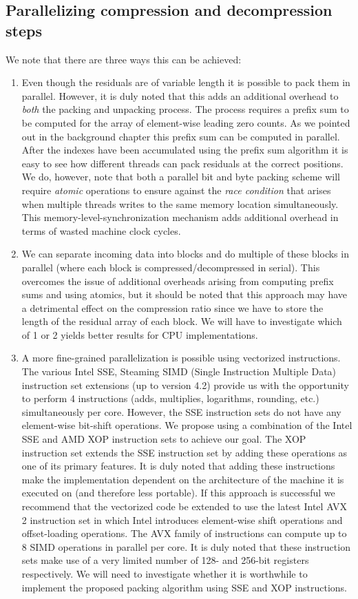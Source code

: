 \documentclass{acm_proc_article-sp}
\begin{document}
\subsection{Parallelizing compression and decompression steps}
We note that there are three ways this can be achieved: 
\begin{enumerate}
 \item Even though the residuals are of variable length it is possible to pack them in parallel. However, it is duly noted that this adds an additional overhead to \textit{both} the packing and 
 unpacking process. The process requires a prefix sum to be computed for the array of element-wise leading zero counts. As we pointed out in the background chapter this prefix sum can be computed
 in parallel. After the indexes have been accumulated using the prefix sum algorithm it is easy to see how different threads can pack residuals at the correct positions. We do, however, note that
 both a parallel bit and byte packing scheme will require \textit{atomic} operations to ensure against the \textit{race condition} that arises when multiple threads writes to the same memory location 
 simultaneously. This memory-level-synchronization mechanism adds additional overhead in terms of wasted machine clock cycles.
 \item We can separate incoming data into blocks and do multiple of these blocks in parallel (where each block is compressed/decompressed in serial). This overcomes the issue of additional overheads arising
 from computing prefix sums and using atomics, but it should be noted that this approach may have a detrimental effect on the compression ratio since we have to store the length of the residual array of each block.
 We will have to investigate which of 1 or 2 yields better results for CPU implementations.
 \item A more fine-grained parallelization is possible using vectorized instructions. The various Intel SSE, Steaming SIMD (Single Instruction Multiple Data) instruction set extensions (up to version 4.2) provide
 us with the opportunity to perform 4 instructions (adds, multiplies, logarithms, rounding, etc.) simultaneously per core. However, the SSE instruction sets do not have any element-wise bit-shift operations. We propose 
 using a combination of the Intel SSE and AMD XOP instruction sets to achieve our goal. The XOP instruction set extends the SSE instruction set by adding these operations as one of its primary features. It is
 duly noted that adding these instructions make the implementation dependent on the architecture of the machine it is executed on (and therefore less portable). If this approach is successful we recommend 
 that the vectorized code be extended to use the latest Intel AVX 2 instruction set in which Intel introduces element-wise shift operations and offset-loading operations. The AVX family of instructions
 can compute up to 8 SIMD operations in parallel per core. It is duly noted that these instruction sets make use of a very limited number of 128- and 256-bit registers respectively. We will need to investigate
 whether it is worthwhile to implement the proposed packing algorithm using SSE and XOP instructions.
\end{enumerate}
\end{document}

